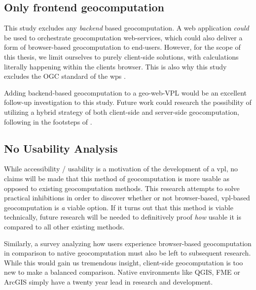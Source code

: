 \subsection*{Only frontend geocomputation}
This study excludes any \emph {backend} based geocomputation.
A web application \textit{could} be used to orchestrate geocomputation web-services, which could also deliver a form of browser-based geocomputation to end-users. 
However, for the scope of this thesis, we limit ourselves to purely client-side solutions, with calculations literally happening within the clients browser. 
This is also why this study excludes the OGC standard of the \ac{wps} \cite{ogc_web_2015}.

Adding backend-based geocomputation to a geo-web-VPL would be an excellent follow-up investigation to this study. 
Future work could research the possibility of utilizing a hybrid strategy of both client-side and server-side geocomputation, following in the footsteps of \cite{panidi_hybrid_2015}. 

\subsection*{No Usability Analysis} %
While accessibility / usability is a motivation of the development of a \ac{vpl}, no claims will be made that this method of geocomputation is more usable as opposed to existing geocomputation methods. This research attempts to solve practical inhibitions in order to discover whether or not browser-based, vpl-based geocomputation is \emph{a} viable option. If it turns out that this method is viable technically, future research will be needed to definitively proof \emph{how} usable it is compared to all other existing methods.  


Similarly, a survey analyzing how users experience browser-based geocomputation in comparison to native geocomputation must also be left to subsequent research. While this would gain us tremendous insight, client-side geocomputation is too new to make a balanced comparison. Native environments like QGIS, FME or ArcGIS simply have a twenty year lead in research and development. 


